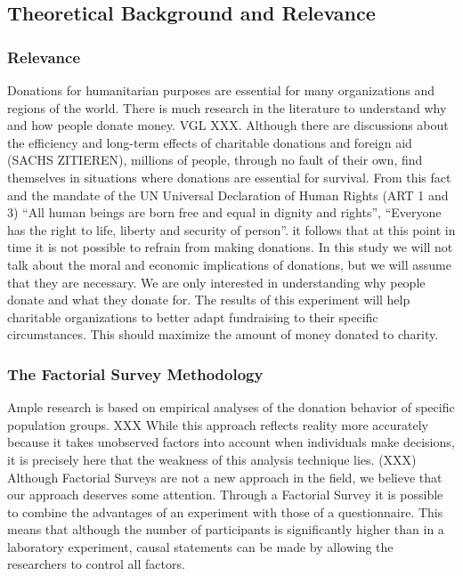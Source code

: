 \documentclass[12pt,]{article}
\begin{document}
\hypertarget{theoretical-background-and-relevance}{%
\subsection{Theoretical Background and
Relevance}\label{theoretical-background-and-relevance}}

\hypertarget{relevance}{%
\subsubsection{Relevance}\label{relevance}}

Donations for humanitarian purposes are essential for many organizations
and regions of the world. There is much research in the literature to
understand why and how people donate money. VGL XXX. Although there are
discussions about the efficiency and long-term effects of charitable
donations and foreign aid (SACHS ZITIEREN), millions of people, through
no fault of their own, find themselves in situations where donations are
essential for survival. From this fact and the mandate of the UN
Universal Declaration of Human Rights (ART 1 and 3) ``All human beings
are born free and equal in dignity and rights'', ``Everyone has the
right to life, liberty and security of person''. it follows that at this
point in time it is not possible to refrain from making donations. In
this study we will not talk about the moral and economic implications of
donations, but we will assume that they are necessary. We are only
interested in understanding why people donate and what they donate for.
The results of this experiment will help charitable organizations to
better adapt fundraising to their specific circumstances. This should
maximize the amount of money donated to charity.

\hypertarget{the-factorial-survey-methodology}{%
\subsubsection{The Factorial Survey
Methodology}\label{the-factorial-survey-methodology}}

Ample research is based on empirical analyses of the donation behavior
of specific population groups. XXX While this approach reflects reality
more accurately because it takes unobserved factors into account when
individuals make decisions, it is precisely here that the weakness of
this analysis technique lies. (XXX) Although Factorial Surveys are not a
new approach in the field, we believe that our approach deserves some
attention. Through a Factorial Survey it is possible to combine the
advantages of an experiment with those of a questionnaire. This means
that although the number of participants is significantly higher than in
a laboratory experiment, causal statements can be made by allowing the
researchers to control all factors.
\end{document}
